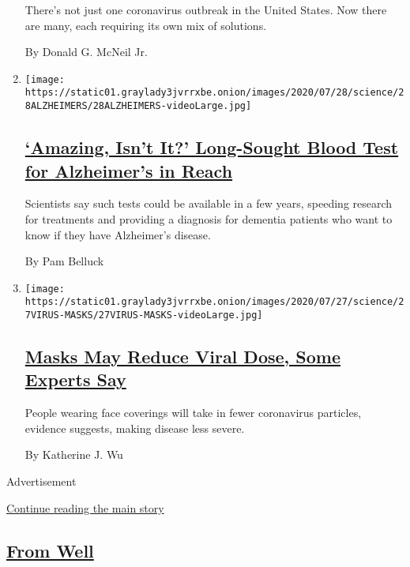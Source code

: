 \begin{enumerate}
  There's not just one coronavirus outbreak in the United States. Now
  there are many, each requiring its own mix of solutions.

  By Donald G. McNeil Jr.
\item
  \texttt{[image: https://static01.graylady3jvrrxbe.onion/images/2020/07/28/science/28ALZHEIMERS/28ALZHEIMERS-videoLarge.jpg]}

  \hypertarget{amazing-isnt-it-long-sought-blood-test-for-alzheimers-in-reach}{%
  \subsection{\texorpdfstring{\href{/2020/07/28/health/alzheimers-blood-test.html}{`Amazing,
  Isn't It?' Long-Sought Blood Test for Alzheimer's in
  Reach}}{`Amazing, Isn't It?' Long-Sought Blood Test for Alzheimer's in Reach}}\label{amazing-isnt-it-long-sought-blood-test-for-alzheimers-in-reach}}

  Scientists say such tests could be available in a few years, speeding
  research for treatments and providing a diagnosis for dementia
  patients who want to know if they have Alzheimer's disease.

  By Pam Belluck
\item
  \texttt{[image: https://static01.graylady3jvrrxbe.onion/images/2020/07/27/science/27VIRUS-MASKS/27VIRUS-MASKS-videoLarge.jpg]}

  \hypertarget{masks-may-reduce-viral-dose-some-experts-say}{%
  \subsection{\texorpdfstring{\href{/2020/07/27/health/coronavirus-mask-protection.html}{Masks
  May Reduce Viral Dose, Some Experts
  Say}}{Masks May Reduce Viral Dose, Some Experts Say}}\label{masks-may-reduce-viral-dose-some-experts-say}}

  People wearing face coverings will take in fewer coronavirus
  particles, evidence suggests, making disease less severe.

  By Katherine J. Wu
\end{enumerate}

Advertisement

\protect\hyperlink{after-mid1}{Continue reading the main story}

\hypertarget{from-well}{%
\subsection{\texorpdfstring{\href{/section/well}{From
Well}}{From Well}}\label{from-well}}

